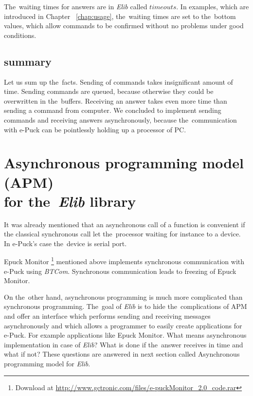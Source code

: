   \begin{definition}[Timeout]
  The~waiting times for answers are in {\it Elib} called $timeouts$.
  In examples, which are introduced in Chapter ~\ref{chap:usage}, the~waiting times are set to the~bottom values,
  which allow commands to be confirmed without no problems under good conditions.
  \end{definition}
  
  \subsection*{summary} %
  Let us sum up the~facts. Sending of commands takes insignificant amount of time.
  Sending commands are queued, because otherwise they could be overwritten in the~buffers.
  Receiving an answer takes even more time than sending a command from computer.
  We concluded to implement sending commands and receiving answers asynchronously, because the~communication with e-Puck
  can be pointlessly holding up a processor of PC.

\section{Asynchronous programming model (APM)\\ for the~{\it Elib} library}
  \label{sec:apm}
  It was already mentioned that an asynchronous call of a function is convenient if the
  classical synchronous call let the~processor waiting for instance to a device.
  In e-Puck's case the~device is serial port. 
   
  Epuck Monitor \footnote{\small{Download at \url{http://www.gctronic.com/files/e-puckMonitor_2.0_code.rar}}}
  mentioned above implements synchronous communication with e-Puck using {\it BTCom}.
  Synchronous communication leads to freezing of Epuck Monitor. 

  On the~other hand, asynchronous programming is much more complicated than synchronous programming.
  The~goal of {\it Elib} is to hide the~complications of APM and offer an interface
  which performs sending and receiving messages asynchronously and
  which allows a programmer to easily create applications for e-Puck. For example applications like Epuck Monitor.
  What means asynchronous implementation in case of {\it Elib}? What is done if the~answer receives in time
  and what if not? These questions are answered in next section called Asynchronous programming model for {\it Elib}.

